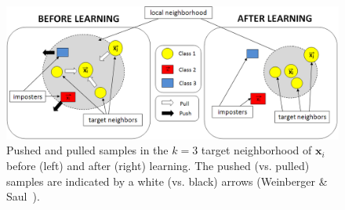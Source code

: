 \begin{figure}[h!]
	\centering
	\begin{minipage}[b]{0.85\linewidth}		
		\centerline{\includegraphics[width=0.8\linewidth]{./images/TargetImposterRepresentationCao}}
	\end{minipage}
	\caption{Pushed and pulled samples in the $k=3$ target neighborhood of $\textbf{x}_i$ before (left) and after (right) learning. The pushed (vs. pulled) samples are indicated by a white (vs. black) arrows (Weinberger \& Saul~\cite{Weinberger2009}).}
	\label{fig:TargetImposterRepresentation}
\end{figure}

